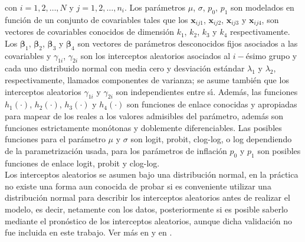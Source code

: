 
con $i=1,2,\ldots, N$ y $j=1,2,\ldots, n_i$. Los par\'{a}metros $\mu$, $\sigma$, $p_0$, $p_1$ son modelados en funci\'{o}n de un conjunto de covariables tales que los $\mathbf{x}_{ij1}$, $\mathbf{x}_{ij2}$, $\mathbf{x}_{ij3}$ y $\mathbf{x}_{ij4}$, son vectores de covariables conocidos de dimensi\'{o}n $k_1$, $k_2$, $k_3$ y $k_4$ respectivamente. Los $\boldsymbol{\beta}_1$, $\boldsymbol{\beta}_2$, $\boldsymbol{\beta}_3$ y $\boldsymbol{\beta}_4$ son vectores de par\'{a}metros desconocidos fijos asociados a las covariables y $\gamma_{1i}$, $\gamma_{2i}$ son los interceptos aleatorios asociados al $i-$\'{e}simo grupo y cada uno distribuido normal con media cero y desviaci\'{o}n est\'{a}ndar $\lambda_1$ y $\lambda_2$, respectivamente, llamados componentes de varianza; se asume tambi\'{e}n que los interceptos aleatorios $\gamma_{1i}$ y $\gamma_{2i}$ son independientes entre s\'{\i}. Adem\'{a}s, las funciones $h_1(\cdot)$, $h_2(\cdot)$, $h_3(\cdot)$ y $h_4(\cdot)$ son funciones de enlace conocidas y apropiadas para mapear de los reales a los valores admisibles del par\'{a}metro, adem\'{a}s son funciones estrictamente mon\'{o}tonas y doblemente diferenciables. Las posibles funciones para el par\'{a}metro $\mu$ y $\sigma$ son logit, probit, clog-log, o log dependiendo de la parametrizaci\'{o}n usada, para los par\'{a}metros de inflaci\'{o}n $p_0$ y $p_1$ son posibles funciones de enlace logit, probit y clog-log.\\

Los interceptos aleatorios se asumen bajo una distribuci\'{o}n normal, en la pr\'{a}ctica no existe una forma aun conocida de probar si es conveniente utilizar una distribuci\'{o}n normal para describir los interceptos aleatorios antes de realizar el modelo, es decir, netamente con los datos, posteriormente si es posible saberlo mediante el pron\'{o}stico de los interceptos aleatorios, aunque dicha validaci\'{o}n no fue incluida en este trabajo. Ver m\'{a}s en \cite{McCulloch2} y en \cite{McCulloch1}.



